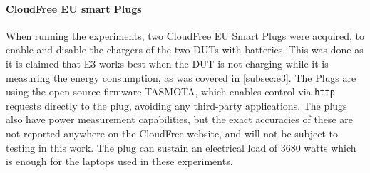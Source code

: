 \paragraph*{CloudFree EU smart Plugs}

When running the experiments, two CloudFree EU Smart Plugs\cite{CloudFreeEUSMartPlug} were acquired, to enable and disable the chargers of the two DUTs with batteries. This was done as it is claimed that E3 works best when the DUT is not charging while it is measuring the energy consumption, as was covered in \cref{subsec:e3}. The Plugs are using the open-source firmware TASMOTA\cite{TomatoGit}, which enables control via \texttt{http} requests directly to the plug, avoiding any third-party applications. The plugs also have power measurement capabilities, but the exact accuracies of these are not reported anywhere on the CloudFree website, and will not be subject to testing in this work. The plug can sustain an electrical load of 3680 watts which is enough for the laptops used in these experiments.\cite{CloudFreeEUSMartPlug}